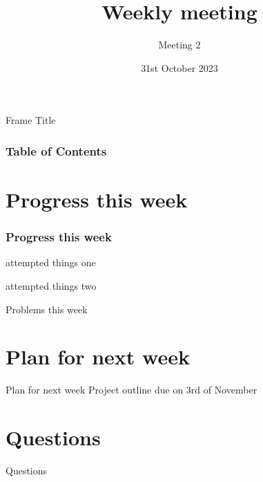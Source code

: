 \documentclass{beamer}
\title{Weekly meeting}
\subtitle{Meeting 2}
\date{31st October 2023}
\begin{document}
\frame{\titlepage}

\begin{frame}{Frame Title}
\frametitle{Table of Contents}
\tableofcontents
\end{frame}


\section{Progress this week}
\begin{frame}
\frametitle{Progress this week}
attempted things one

attempted things two
\end{frame}

\begin{frame}{Problems this week}
    
\end{frame}

\section{Plan for next week}
\begin{frame}{Plan for next week}
    Project outline due on 3rd of November
\end{frame}

\section{Questions}

\begin{frame}{Questions}
    
\end{frame}
\end{document}
